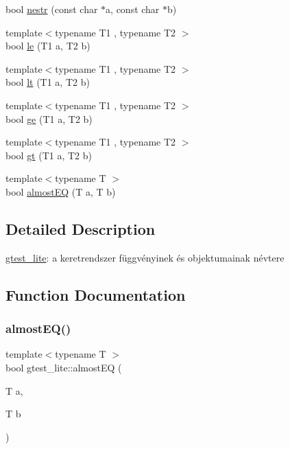 \begin{DoxyCompactItemize}
\item 
bool \mbox{\hyperlink{namespacegtest__lite_a0a34b1bb0d55bc0c6a3e878ec2bcd49f}{nestr}} (const char $\ast$a, const char $\ast$b)
\item 
{\footnotesize template$<$typename T1 , typename T2 $>$ }\\bool \mbox{\hyperlink{namespacegtest__lite_a5cd2ce368021471b16b4814b179c9c34}{le}} (T1 a, T2 b)
\item 
{\footnotesize template$<$typename T1 , typename T2 $>$ }\\bool \mbox{\hyperlink{namespacegtest__lite_afb471377c0d2d30aeeaf8912db72f0ff}{lt}} (T1 a, T2 b)
\item 
{\footnotesize template$<$typename T1 , typename T2 $>$ }\\bool \mbox{\hyperlink{namespacegtest__lite_a77c1a7cf1d34c46c1d97ed39b9f06050}{ge}} (T1 a, T2 b)
\item 
{\footnotesize template$<$typename T1 , typename T2 $>$ }\\bool \mbox{\hyperlink{namespacegtest__lite_aa0100ec9e095a9403a7b70ad4a162fdd}{gt}} (T1 a, T2 b)
\item 
{\footnotesize template$<$typename T $>$ }\\bool \mbox{\hyperlink{namespacegtest__lite_affbf9748c4e4dec6db137f7c147fee61}{almost\+EQ}} (T a, T b)
\end{DoxyCompactItemize}


\subsection{Detailed Description}
\mbox{\hyperlink{namespacegtest__lite}{gtest\+\_\+lite}}\+: a keretrendszer függvényinek és objektumainak névtere 

\subsection{Function Documentation}
\mbox{\label{namespacegtest__lite_affbf9748c4e4dec6db137f7c147fee61}} 
\subsubsection{\texorpdfstring{almostEQ()}{almostEQ()}}
{\footnotesize\ttfamily template$<$typename T $>$ \\
bool gtest\+\_\+lite\+::almost\+EQ (\begin{DoxyParamCaption}\item[{T}]{a,  }\item[{T}]{b }\end{DoxyParamCaption})}

